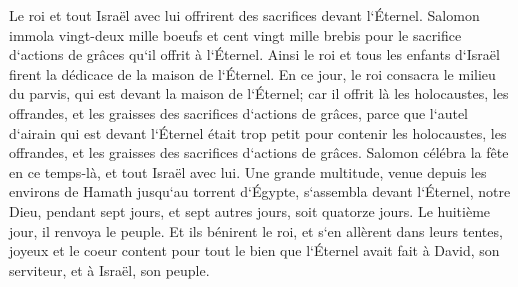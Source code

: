 \verse Le roi et tout Israël avec lui offrirent des sacrifices devant l`Éternel. 
\verse Salomon immola vingt-deux mille boeufs et cent vingt mille brebis pour le sacrifice d`actions de grâces qu`il offrit à l`Éternel. Ainsi le roi et tous les enfants d`Israël firent la dédicace de la maison de l`Éternel. 
\verse En ce jour, le roi consacra le milieu du parvis, qui est devant la maison de l`Éternel; car il offrit là les holocaustes, les offrandes, et les graisses des sacrifices d`actions de grâces, parce que l`autel d`airain qui est devant l`Éternel était trop petit pour contenir les holocaustes, les offrandes, et les graisses des sacrifices d`actions de grâces. 
\verse Salomon célébra la fête en ce temps-là, et tout Israël avec lui. Une grande multitude, venue depuis les environs de Hamath jusqu`au torrent d`Égypte, s`assembla devant l`Éternel, notre Dieu, pendant sept jours, et sept autres jours, soit quatorze jours. 
\verse Le huitième jour, il renvoya le peuple. Et ils bénirent le roi, et s`en allèrent dans leurs tentes, joyeux et le coeur content pour tout le bien que l`Éternel avait fait à David, son serviteur, et à Israël, son peuple. 

